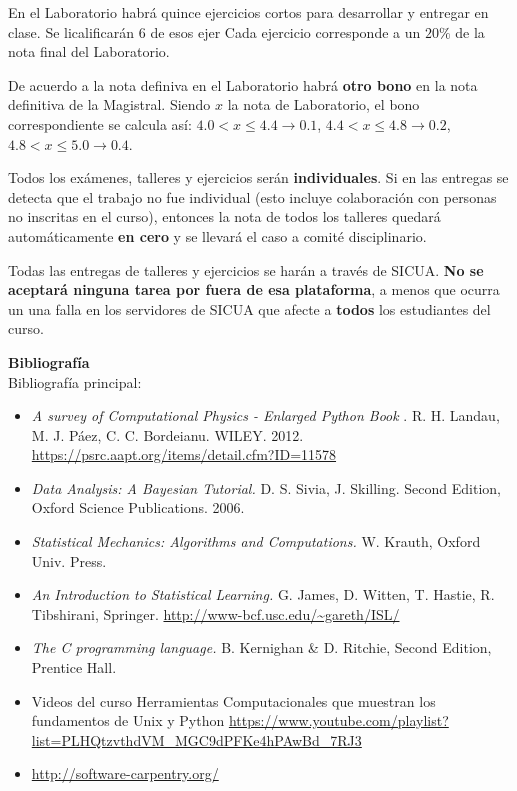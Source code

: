 \documentclass[letterpaper,10pt,onecolumn]{article}
\begin{document}
En el Laboratorio habr\'a quince ejercicios cortos para desarrollar y
entregar en clase.  Se licalificar\'an 6 de esos ejer
Cada ejercicio corresponde a un $20\%$ de la nota final del
Laboratorio. 

De acuerdo a la nota definiva en el Laboratorio habr\'a {\bf otro bono} en la
nota definitiva de la Magistral. 
Siendo $x$ la nota de Laboratorio, el bono correspondiente
se calcula as\'i:
$4.0 < x \leq 4.4 \rightarrow 0.1$, $4.4< x\leq 4.8\rightarrow 0.2$, $4.8<x
\leq 5.0\rightarrow 0.4$.

Todos los ex\'amenes, talleres y ejercicios ser\'an
\textbf{individuales}.  
Si en las entregas se detecta que el trabajo no fue
individual (esto incluye colaboraci\'on con personas no inscritas en
el curso), entonces la nota de todos los talleres quedar\'a
autom\'aticamente {\bf en cero} y se llevar\'a el caso a comit\'e
disciplinario. 

Todas las entregas de talleres y ejercicios se har\'an a trav\'es de
SICUA.  {\bf No se aceptar\'a ninguna tarea por fuera de esa
  plataforma}, a menos que ocurra un una falla en los servidores de
SICUA que afecte a {\bf todos} los estudiantes del curso.



\noindent\textbf{\large {} \quad
  Bibliograf\'ia}\\[-0.2cm] 



\noindent\normalsize Bibliograf\'ia principal:

\begin{itemize}
\item
\textit{A survey of Computational Physics - Enlarged Python Book}
. R. H. Landau, M. J. P\'aez, C. C. Bordeianu. WILEY. 2012.
\url{https://psrc.aapt.org/items/detail.cfm?ID=11578}

\item
\textit{Data Analysis: A Bayesian Tutorial.} D. S. Sivia,
J. Skilling. Second Edition, Oxford Science Publications. 2006.

\item 
\textit{Statistical Mechanics: Algorithms and Computations.}
W. Krauth, Oxford Univ. Press. 

\item
\textit{An Introduction to Statistical Learning.} G. James, D. Witten,
T. Hastie, R. Tibshirani,
Springer. \url{http://www-bcf.usc.edu/~gareth/ISL/} 

\item
\textit{The C programming language.}
 B. Kernighan \& D. Ritchie, Second Edition, Prentice Hall.

\item Videos del curso Herramientas Computacionales que muestran los
  fundamentos de Unix y Python \url{https://www.youtube.com/playlist?list=PLHQtzvthdVM_MGC9dPFKe4hPAwBd_7RJ3}

\item\url{http://software-carpentry.org/}
\end{itemize}
\end{document}
